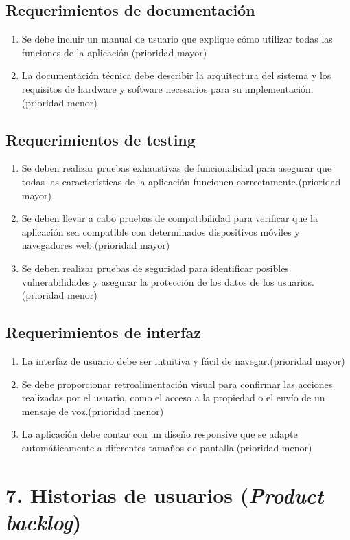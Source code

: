 \documentclass[
11pt, %
codirector, %
]{charter}
\begin{document}
\subsection{Requerimientos de documentación}
\begin{enumerate}
\item Se debe incluir un manual de usuario que explique cómo utilizar todas las funciones de la aplicación.(prioridad mayor)
\item La documentación técnica debe describir la arquitectura del sistema y los requisitos de hardware y software necesarios para su implementación.(prioridad menor)
\end{enumerate}

\subsection{Requerimientos de testing}
\begin{enumerate}
\item Se deben realizar pruebas exhaustivas de funcionalidad para asegurar que todas las características de la aplicación funcionen correctamente.(prioridad mayor)
\item Se deben llevar a cabo pruebas de compatibilidad para verificar que la aplicación sea compatible con determinados dispositivos móviles y navegadores web.(prioridad mayor)
\item Se deben realizar pruebas de seguridad para identificar posibles vulnerabilidades y asegurar la protección de los datos de los usuarios.(prioridad menor)
\end{enumerate}

\subsection{Requerimientos de interfaz}
\begin{enumerate}
\item La interfaz de usuario debe ser intuitiva y fácil de navegar.(prioridad mayor)
\item Se debe proporcionar retroalimentación visual para confirmar las acciones realizadas por el usuario, como el acceso a la propiedad o el envío de un mensaje de voz.(prioridad menor)
\item La aplicación debe contar con un diseño responsive que se adapte automáticamente a diferentes tamaños de pantalla.(prioridad menor)
\end{enumerate}

\section{7. Historias de usuarios (\textit{Product backlog})}
\label{sec:backlog}
\end{document}
